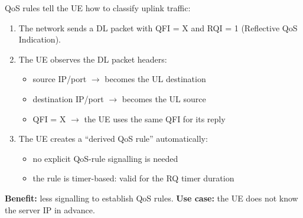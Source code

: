 QoS rules tell the UE how to classify uplink traffic:



\begin{enumerate}
\def\labelenumi{\arabic{enumi}.}
\tightlist
\item
  The network sends a DL packet with QFI = X and RQI = 1 (Reflective QoS Indication).
\item
  The UE observes the DL packet headers:

  \begin{itemize}
  \tightlist
  \item
    source IP/\allowbreak{}port \ensuremath{\to} becomes the UL destination
  \item
    destination IP/\allowbreak{}port \ensuremath{\to} becomes the UL source
  \item
    QFI = X \ensuremath{\to} the UE uses the same QFI for its reply
  \end{itemize}
\item
  The UE creates a “derived QoS rule” automatically:

  \begin{itemize}
  \tightlist
  \item
    no explicit QoS-rule signalling is needed
  \item
    the rule is timer-based: valid for the RQ timer duration
  \end{itemize}
\end{enumerate}

\textbf{Benefit:} less signalling to establish QoS rules. \textbf{Use case:} the UE does not know the server IP in advance.




\CNchained{}




